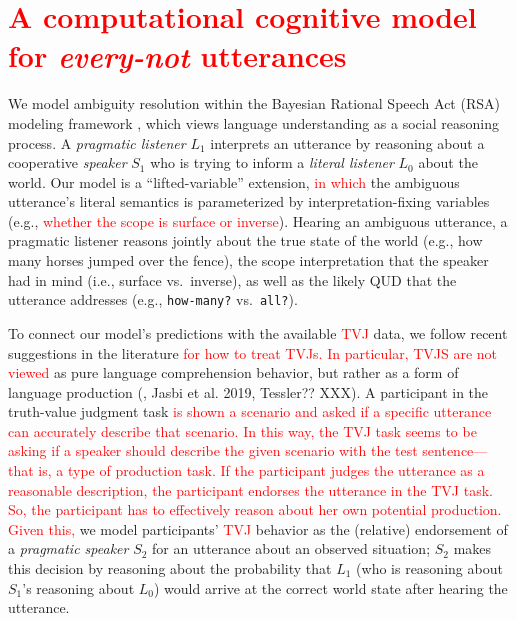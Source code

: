 \documentclass[preprint,authoryear]{elsarticle}\frenchspacing
\newcommand{\lp}[1]{\textcolor{red}{#1}} %
\begin{document}
\section{
\lp{A computational cognitive model for \emph{every-not} utterances}
} \label{every-not-model}

We model  ambiguity resolution within the Bayesian Rational Speech Act (RSA) modeling framework \citep{goodmanfrank2016}, which views language understanding as a social reasoning process. A \textit{pragmatic listener} $L_1$ interprets an utterance by reasoning about a cooperative \textit{speaker} $S_1$ who is trying to inform a \textit{literal listener} $L_0$ about the world. Our model is a ``lifted-variable'' extension,
\lp{in which}
the ambiguous utterance's literal semantics is parameterized by interpretation-fixing variables (e.g., 
\lp{whether the scope is surface or inverse}). Hearing an ambiguous utterance, a pragmatic listener reasons jointly about the true state of the world (e.g., how many horses jumped over the fence), the scope interpretation that the speaker had in mind (i.e., surface vs.~inverse), as well as the likely QUD that the utterance addresses (e.g., \texttt{how-many?} vs.~\texttt{all?}).  

To connect our model's predictions with the available %
\lp{TVJ}
data, we follow recent suggestions in the literature 
\lp{for how to treat TVJs.}
\lp{In particular, TVJS are not viewed}
as pure language comprehension behavior, but rather as a form of language production (\citealp{degengoodman2014}, Jasbi et al. 2019, Tessler?? XXX).
A participant in the truth-value judgment task \lp{is shown a scenario and asked if a specific utterance can accurately describe that scenario. In this way, the TVJ task seems to be asking if a speaker should describe the given scenario with the test sentence---that is, a type of production task.
}
\lp{If the participant judges the utterance as a reasonable description, the participant endorses the utterance in the TVJ task. So, the participant has to effectively reason about her own potential production.}
\lp{Given this,}
we model participants' 
\lp{TVJ}
behavior as the (relative) endorsement of  a \textit{pragmatic speaker} $S_2$ for an utterance about an observed situation; $S_2$ makes this decision by reasoning about the probability that $L_1$ (who is reasoning about $S_1$'s reasoning about $L_0$) would arrive at the correct world state after hearing the utterance. 
\end{document}
